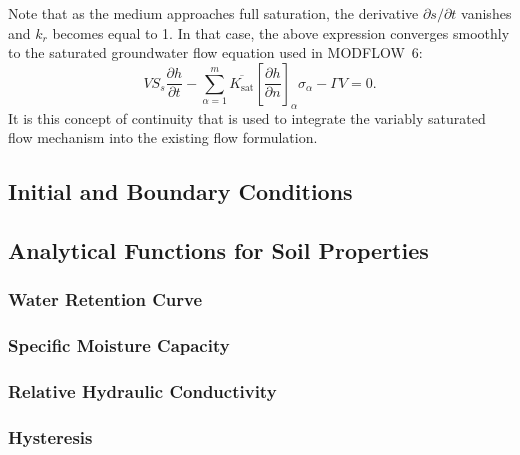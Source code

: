 \documentclass[fleqn]{article}
\begin{document}
Note that as the medium approaches full saturation, the derivative
$\partial s/ \partial t$ vanishes and $k_r$ becomes equal to 1.
In that case, the above expression converges smoothly to the saturated
groundwater flow equation used in MODFLOW~6:
\begin{equation}
  V S_s \frac{\partial h}{\partial t} -
  \sum_{\alpha=1}^{m} \overline{K_{\textrm{sat}}}
  \left[\frac{\partial h}{\partial n}\right]_\alpha \sigma_\alpha -
  \Gamma V = 0.
  \label{eq-sat-flow}
\end{equation}
It is this concept of
continuity that is used to integrate the variably saturated flow 
mechanism into the existing flow formulation.


\subsection{Initial and Boundary Conditions}\label{sec-boundary-conditions}


\subsection{Analytical Functions for Soil Properties}
\subsubsection*{Water Retention Curve}
\subsubsection*{Specific Moisture Capacity}
\subsubsection*{Relative Hydraulic Conductivity}
\subsubsection*{Hysteresis}
\end{document}

